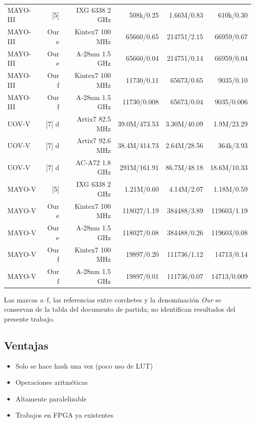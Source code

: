 \begin{longtable}{lrrrrr}
{MAYO-III} & {[5]} & {IXG 6338 2 GHz} & {508k/0.25} & {1.66M/0.83} & {610k/0.30} \\
{MAYO-III} & {Our e} & {Kintex7 100 MHz} & {65660/0.65} & {214751/2.15} & {66959/0.67} \\
{MAYO-III} & {Our e} & {A-28nm 1.5 GHz} & {65660/0.04} & {214751/0.14} & {66959/0.04} \\
{MAYO-III} & {Our f} & {Kintex7 100 MHz} & {11730/0.11} & {65673/0.65} & {9035/0.10} \\
{MAYO-III} & {Our f} & {A-28nm 1.5 GHz} & {11730/0.008} & {65673/0.04} & {9035/0.006} \\
{UOV-V} & {[7] d} & {Artix7 82.5 MHz} & {39.0M/473.53} & {3.30M/40.09} & {1.9M/23.29} \\
{UOV-V} & {[7] d} & {Artix7 92.6 MHz} & {38.4M/414.73} & {2.64M/28.56} & {364k/3.93} \\
{UOV-V} & {[7] d} & {AC-A72 1.8 GHz} & {291M/161.91} & {86.7M/48.18} & {18.6M/10.33} \\
{MAYO-V} & {[5]} & {IXG 6338 2 GHz} & {1.21M/0.60} & {4.14M/2.07} & {1.18M/0.59} \\
{MAYO-V} & {Our e} & {Kintex7 100 MHz} & {118027/1.19} & {384488/3.89} & {119603/1.19} \\
{MAYO-V} & {Our e} & {A-28nm 1.5 GHz} & {118027/0.08} & {384488/0.26} & {119603/0.08} \\
{MAYO-V} & {Our f} & {Kintex7 100 MHz} & {19897/0.20} & {111736/1.12} & {14713/0.14} \\
{MAYO-V} & {Our f} & {A-28nm 1.5 GHz} & {19897/0.01} & {111736/0.07} & {14713/0.009} \\
\end{longtable}
\endgroup
Las marcas a--f, las referencias entre corchetes y la denominación \textit{Our} se conservan de la tabla del documento de partida; no identifican resultados del presente trabajo.



\subsection*{Ventajas}
\begin{itemize}
\item Solo se hace hash una vez (poco uso de LUT)
\item Operaciones aritméticas
\item Altamente paralelizable
\item Trabajos en FPGA ya existentes
\end{itemize}

